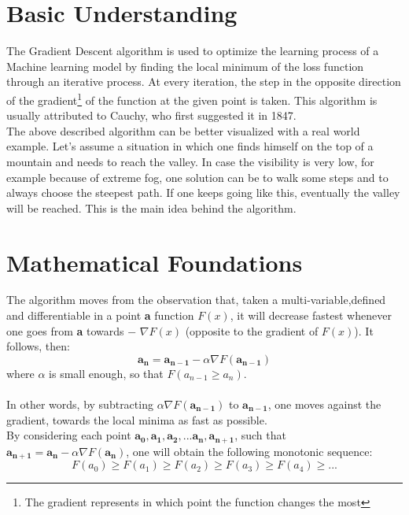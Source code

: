 \documentclass[conference]{IEEEtran}
\begin{document}
 
\section{Basic Understanding }

The Gradient Descent algorithm is used to optimize the learning process of a Machine learning model by finding the local minimum of the loss function through an iterative process. At every iteration, the step in the opposite direction of the gradient\footnote{ The gradient represents in which point the function changes the most}  of the function at the given point is taken. 
This algorithm is usually attributed to Cauchy, who first suggested it in 1847.\\
The above described algorithm can be better visualized with a real world example.
Let's assume a situation in which one finds himself on the top of a mountain and needs to reach the valley. In case the visibility is very low, for example because of extreme fog, one solution can be to walk some steps and to always choose the steepest path. If one keeps going like this, eventually the valley will be reached. 
This is the main idea behind the algorithm.





\section{Mathematical Foundations}

The algorithm moves from the observation that, taken a multi-variable,defined and differentiable in a point \textbf{a} function $F(x)$, it will decrease fastest whenever one goes from \textbf{a}  towards $-$ $\nabla F(x)$  (opposite to the gradient of $F(x)$).
It follows, then:
\begin{equation}
    \mathbf{a_{n}} = \mathbf{a_{n-1}} - \alpha\nabla F(\mathbf{a_{n-1}})\label{eq:original}
\end{equation}
where $\alpha$ is small enough, so that $F(a_{n-1} \geq a_{n})$.\\\\
In other words, by subtracting $\alpha\nabla F(\mathbf{a_{n-1}})$ to $\mathbf{a_{n-1}}$, one moves against the gradient, towards the local minima as fast as possible. \\By considering each point $\mathbf{a_{0}},\mathbf{a_{1}},\mathbf{a_{2}},...\mathbf{a_{n},\mathbf{a_{n+1}}}$, such that 
$\mathbf{a_{n+1}} = \mathbf{a_{n}} - \alpha\nabla F(\mathbf{a_{n}})$, one will obtain the following monotonic sequence:
\[
   F(a_{0}) \geq F(a_{1})\geq F(a_{2})\geq F(a_{3})\geq F(a_{4}) \geq ...
\]
\end{document}

